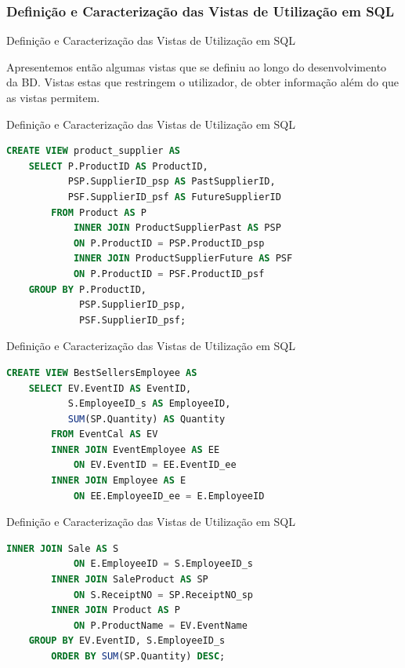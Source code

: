 \documentclass[compress,svgnames,handout,13.7pt]{beamer}
\begin{document}
\subsubsection{Defini\c{c}\~{a}o e Caracteriza\c{c}\~{a}o das Vistas de Utiliza\c{c}\~{a}o em SQL}
\begin{frame}{Defini\c{c}\~{a}o e Caracteriza\c{c}\~{a}o das Vistas de Utiliza\c{c}\~{a}o em SQL}

Apresentemos então algumas vistas que se definiu ao longo do desenvolvimento da BD. Vistas estas que restringem o utilizador, de obter informação além do que as vistas permitem. 
\end{frame}
\begin{frame}[fragile]{Defini\c{c}\~{a}o e Caracteriza\c{c}\~{a}o das Vistas de Utiliza\c{c}\~{a}o em SQL}
\begin{lstlisting}[language=sql]
CREATE VIEW product_supplier AS
    SELECT P.ProductID AS ProductID, 
           PSP.SupplierID_psp AS PastSupplierID,
           PSF.SupplierID_psf AS FutureSupplierID
        FROM Product AS P 
            INNER JOIN ProductSupplierPast AS PSP 
            ON P.ProductID = PSP.ProductID_psp
            INNER JOIN ProductSupplierFuture AS PSF
            ON P.ProductID = PSF.ProductID_psf
    GROUP BY P.ProductID,
             PSP.SupplierID_psp,
             PSF.SupplierID_psf;
\end{lstlisting}
\end{frame}
\begin{frame}[fragile]{Defini\c{c}\~{a}o e Caracteriza\c{c}\~{a}o das Vistas de Utiliza\c{c}\~{a}o em SQL}
\begin{lstlisting}[language=sql]
CREATE VIEW BestSellersEmployee AS
    SELECT EV.EventID AS EventID,
           S.EmployeeID_s AS EmployeeID,
           SUM(SP.Quantity) AS Quantity
        FROM EventCal AS EV 
        INNER JOIN EventEmployee AS EE
            ON EV.EventID = EE.EventID_ee
        INNER JOIN Employee AS E
            ON EE.EmployeeID_ee = E.EmployeeID
\end{lstlisting}
\end{frame}
\begin{frame}[fragile]{Defini\c{c}\~{a}o e Caracteriza\c{c}\~{a}o das Vistas de Utiliza\c{c}\~{a}o em SQL}
\begin{lstlisting}[language=sql] 
        INNER JOIN Sale AS S
            ON E.EmployeeID = S.EmployeeID_s
        INNER JOIN SaleProduct AS SP
            ON S.ReceiptNO = SP.ReceiptNO_sp
        INNER JOIN Product AS P
            ON P.ProductName = EV.EventName
    GROUP BY EV.EventID, S.EmployeeID_s
        ORDER BY SUM(SP.Quantity) DESC;
\end{lstlisting}
\end{frame}
\end{document}
